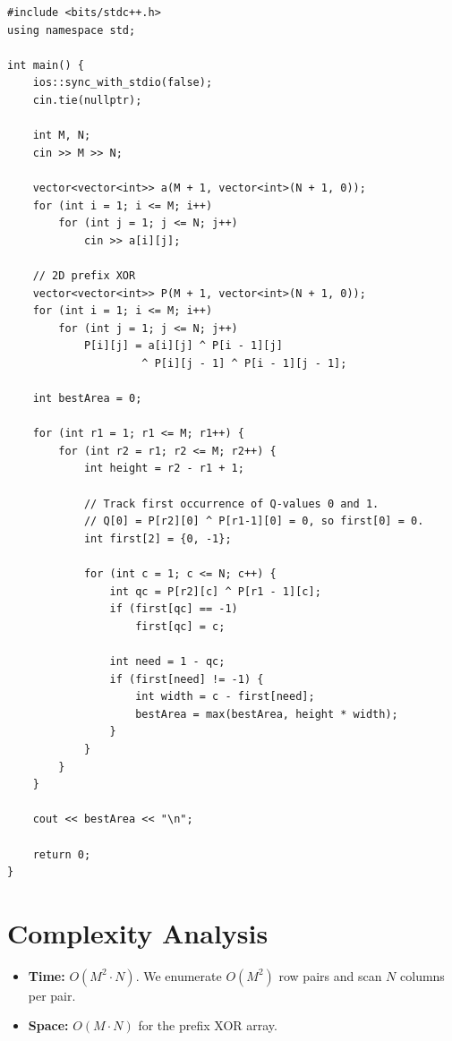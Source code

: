 \documentclass[11pt,a4paper]{article}
\begin{document}
\begin{lstlisting}
#include <bits/stdc++.h>
using namespace std;

int main() {
    ios::sync_with_stdio(false);
    cin.tie(nullptr);

    int M, N;
    cin >> M >> N;

    vector<vector<int>> a(M + 1, vector<int>(N + 1, 0));
    for (int i = 1; i <= M; i++)
        for (int j = 1; j <= N; j++)
            cin >> a[i][j];

    // 2D prefix XOR
    vector<vector<int>> P(M + 1, vector<int>(N + 1, 0));
    for (int i = 1; i <= M; i++)
        for (int j = 1; j <= N; j++)
            P[i][j] = a[i][j] ^ P[i - 1][j]
                     ^ P[i][j - 1] ^ P[i - 1][j - 1];

    int bestArea = 0;

    for (int r1 = 1; r1 <= M; r1++) {
        for (int r2 = r1; r2 <= M; r2++) {
            int height = r2 - r1 + 1;

            // Track first occurrence of Q-values 0 and 1.
            // Q[0] = P[r2][0] ^ P[r1-1][0] = 0, so first[0] = 0.
            int first[2] = {0, -1};

            for (int c = 1; c <= N; c++) {
                int qc = P[r2][c] ^ P[r1 - 1][c];
                if (first[qc] == -1)
                    first[qc] = c;

                int need = 1 - qc;
                if (first[need] != -1) {
                    int width = c - first[need];
                    bestArea = max(bestArea, height * width);
                }
            }
        }
    }

    cout << bestArea << "\n";

    return 0;
}
\end{lstlisting}

\section{Complexity Analysis}
\begin{itemize}
  \item \textbf{Time:} $O(M^2 \cdot N)$. We enumerate $O(M^2)$ row
        pairs and scan $N$ columns per pair.
  \item \textbf{Space:} $O(M \cdot N)$ for the prefix XOR array.
\end{itemize}
\end{document}
